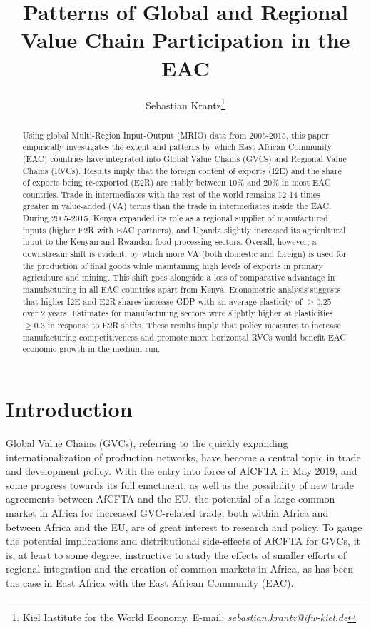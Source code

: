 \documentclass[a4paper]{article}
\title{\textbf{Patterns of Global and Regional Value Chain Participation in the EAC}}
\author{Sebastian Krantz\footnote{Kiel Institute for the World Economy. E-mail: \emph{sebastian.krantz@ifw-kiel.de}}}
\begin{document}
\maketitle

\begin{abstract}
Using global Multi-Region Input-Output (MRIO) data from 2005-2015, this paper empirically investigates the extent and patterns by which East African Community (EAC) countries have integrated into Global Value Chains (GVCs) and Regional Value Chains (RVCs). Results imply that the foreign content of exports (I2E) and the share of exports being re-exported (E2R) are stably between 10\% and 20\% in most EAC countries. Trade in intermediates with the rest of the world remains 12-14 times greater in value-added (VA) terms than the trade in intermediates inside the EAC. During 2005-2015, Kenya expanded its role as a regional supplier of manufactured inputs (higher E2R with EAC partners), and Uganda slightly increased its agricultural input to the Kenyan and Rwandan food processing sectors. Overall, however,  a downstream shift is evident, by which more VA (both domestic and foreign) is used for the production of final goods while maintaining high levels of exports in primary agriculture and mining. This shift goes alongside a loss of comparative advantage in manufacturing in all EAC countries apart from Kenya. Econometric analysis suggests that higher I2E and E2R shares increase GDP with an average elasticity of $\geq 0.25$ over 2 years. Estimates for manufacturing sectors were slightly higher at elasticities $\geq 0.3$ in response to E2R shifts. These results imply that policy measures to increase manufacturing competitiveness and promote more horizontal RVCs would benefit EAC economic growth in the medium run. 
\end{abstract}



\section{Introduction}

Global Value Chains (GVCs), referring to the quickly expanding internationalization of production networks, have become a central topic in trade and development policy. With the entry into force of AfCFTA in May 2019, and some progress towards its full enactment, as well as the possibility of new trade agreements between AfCFTA and the EU, the potential of a large common market in Africa for increased GVC-related trade, both within Africa and between Africa and the EU, are of great interest to research and policy. To gauge the potential implications and distributional side-effects of AfCFTA for GVCs, it is, at least to some degree, instructive to study the effects of smaller efforts of regional integration and the creation of common markets in Africa, as has been the case in East Africa with the East African Community (EAC). \newline 
\end{document}
